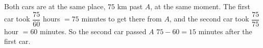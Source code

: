 Both cars are at the same place, $75$ km past $A$, at the same moment. The first car took $\dfrac{75}{60}$ hours $=75$ minutes to get there from $A$, and the second car took $\dfrac{75}{75}$ hour $=60$ minutes. So the second car passed $A$ $75-60=\boxed{15}$ minutes after the first car.
